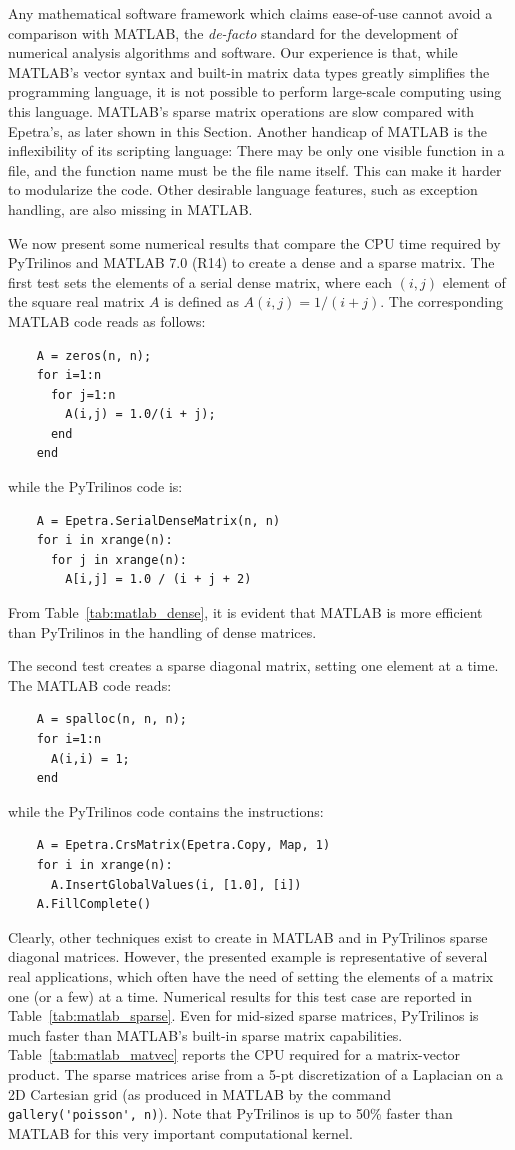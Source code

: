 \documentclass[acmtocl]{acmtrans2m}
\begin{document}
Any mathematical software framework which claims ease-of-use cannot
avoid a comparison with MATLAB, the {\sl de-facto} standard for the
development of numerical analysis algorithms and software.
Our
experience is that, while MATLAB's vector syntax and built-in matrix
data types greatly simplifies the programming language, it is not
possible to perform large-scale computing using this language.
MATLAB's sparse matrix operations are slow compared with Epetra's, as later
shown in this Section.
Another handicap of MATLAB is the inflexibility of its scripting
language: There may be only one visible function in a file, and the
function name must be the file name itself. This can make it harder to
modularize the code. Other desirable language features, such as
exception handling, are also missing in MATLAB.

We now present some numerical results that compare the CPU time required by
PyTrilinos and MATLAB 7.0 (R14) to create a dense and a sparse matrix.
The first test sets the elements of a serial dense matrix, where each
$(i,j)$ element of the square real matrix $A$ is defined as $A(i,j) =
1/(i + j)$. The corresponding MATLAB code reads as follows:
\begin{verbatim}
    A = zeros(n, n);
    for i=1:n
      for j=1:n
        A(i,j) = 1.0/(i + j);
      end
    end
\end{verbatim}
while the PyTrilinos code is:
\begin{verbatim}
    A = Epetra.SerialDenseMatrix(n, n)
    for i in xrange(n):
      for j in xrange(n):
        A[i,j] = 1.0 / (i + j + 2)
\end{verbatim}
From Table~\ref{tab:matlab_dense}, it is evident that MATLAB is more
efficient than PyTrilinos in the handling of dense matrices.

The second test creates a sparse diagonal matrix, setting
one element at a time. The MATLAB code reads:
\begin{verbatim}
    A = spalloc(n, n, n);
    for i=1:n
      A(i,i) = 1;
    end
\end{verbatim}
while the PyTrilinos code contains the instructions:
\begin{verbatim}
    A = Epetra.CrsMatrix(Epetra.Copy, Map, 1)
    for i in xrange(n):
      A.InsertGlobalValues(i, [1.0], [i])
    A.FillComplete()
\end{verbatim}
Clearly, other techniques exist to create in MATLAB and in PyTrilinos
sparse diagonal matrices. However, the presented example is representative of
several real applications, which often have the
need of setting the elements of a matrix one (or a few) at a time. Numerical
results for this test case are reported in Table~\ref{tab:matlab_sparse}. Even
for mid-sized sparse matrices, PyTrilinos is much faster than MATLAB's
built-in sparse matrix capabilities.
Table~\ref{tab:matlab_matvec} reports the CPU required for a matrix-vector
product. The sparse matrices arise from
a 5-pt discretization of a Laplacian on a 2D Cartesian grid
(as produced in MATLAB by the command \verb!gallery('poisson', n)!).  Note
that PyTrilinos is up to 50\% faster than MATLAB for this very
important computational kernel.
\end{document}
